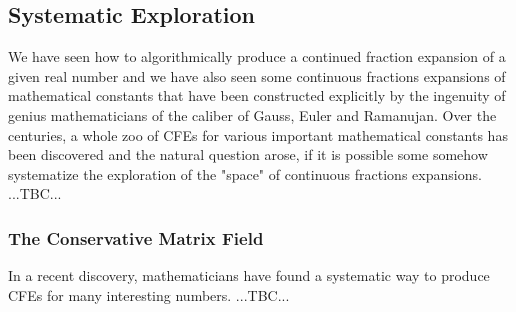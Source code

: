 




\subsection{Systematic Exploration}
We have seen how to algorithmically produce a continued fraction expansion of a given real number and we have also seen some continuous fractions expansions of mathematical constants that have been constructed explicitly by the ingenuity of genius mathematicians of the caliber of Gauss, Euler and Ramanujan. Over the centuries, a whole zoo of CFEs for various important mathematical constants has been discovered and the natural question arose, if it is possible some somehow systematize the exploration of the "space" of continuous fractions expansions. ...TBC...

\subsubsection{The Conservative Matrix Field}
In a recent discovery, mathematicians have found a systematic way to produce CFEs for many interesting numbers. ...TBC...






